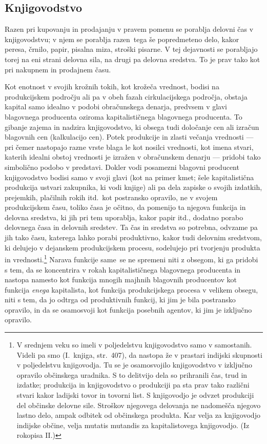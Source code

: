 \documentclass[kapital_02.tex]{subfiles}
\begin{document}
\subsection{Knjigovodstvo}
Razen pri kupovanju in prodajanju v pravem pomenu se porablja delovni čas v knjigovodstvu; v njem se porablja razen\KPEstran\ tega še popredmeteno delo, kakor peresa, črnilo, papir, pisalna miza, stroški pisarne.
V tej dejavnosti se porabljajo torej na eni strani delovna sila, na drugi pa delovna sredstva.
To je prav tako kot pri nakupnem in prodajnem času.

Kot enotnost v svojih krožnih tokih, kot krožeča vrednost, bodisi na produkcijskem področju ali pa v obeh fazah cirkulacijskega področja, obstaja kapital samo idealno v podobi obračunskega denarja, predvsem v glavi blagovnega producenta oziroma kapitalističnega blagovnega producenta.
To gibanje zajema in nadzira knjigovodstvo, ki obsega tudi določanje cen ali izračun blagovnih cen (kalkulacijo cen).
Potek produkcije in zlasti večanja vrednosti — pri čemer nastopajo razne vrste blaga le kot nosilci vrednosti, kot imena stvari, katerih idealni obstoj vrednosti je izražen v obračunskem denarju — pridobi tako simbolično podobo v predstavi.
Dokler vodi posamezni blagovni producent knjigovodstvo bodisi samo v svoji glavi (kot na primer kmet; šele kapitalistična produkcija ustvari zakupnika, ki vodi knjige) ali pa dela zapiske o svojih izdatkih, prejemkih, plačilnih rokih itd.\ kot postransko opravilo, ne v svojem produkcijskem času, toliko časa je očitno, da pomenijo ta njegova funkcija in delovna sredstva, ki jih pri tem uporablja, kakor papir itd., dodatno porabo delovnega časa in delovnih sredstev.
Ta čas in sredstva so potrebna, odvzame pa jih tako času, katerega lahko porabi produktivno, kakor tudi delovnim sredstvom, ki delujejo v dejanskem produkcijskem procesu, sodelujejo pri tvorjenju produkta in vrednosti.\footnote
{V srednjem veku so imeli v poljedelstvu knjigovodstvo samo v samostanih.
Videli pa smo (I.\ knjiga, str.\ 407), da nastopa že v prastari indijski skupnosti v poljedelstvu knjigovodja.
Tu se je osamosvojilo knjigovodstvo v izključno opravilo občinskega uradnika.
S to delitvijo dela so prihranili čas, trud in izdatke; produkcija in knjigovodstvo o produkciji pa sta prav tako različni stvari kakor ladijski tovor in tovorni list.
S knjigovodjo je odvzet produkciji del občinske delovne sile.
Stroškov njegovega delovanja ne nadomešča njegovo lastno delo, ampak odbitek od občinskega produkta.
Kar velja za knjigovodjo indijske občine, velja mutatis mutandis za kapitalistovega knjigovodjo. (Iz rokopisa II.)}
Narava funkcije same\KPEstran\ se ne spremeni niti z obsegom, ki ga pridobi s tem, da se koncentrira v rokah kapitalističnega blagovnega producenta in nastopa namesto kot funkcija mnogih majhnih blagovnih producentov kot funkcija \emph{enega} kapitalista, kot funkcija produkcijskega procesa v velikem obsegu, niti s tem, da jo odtrga od produktivnih funkcij, ki jim je bila postransko opravilo, in da se osamosvoji kot funkcija posebnih agentov, ki jim je izključno opravilo.
\end{document}
